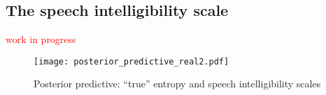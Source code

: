 \begin{comment}
It is important to highlight that for all model implementations, the visual inspection of trace, trace-rank and autocorrelation plots was performed. Additionally, we also evaluated the Gelman-Rubin diagnostic and effective number of samples \cite{Gelman_et_al_2014}. In all cases, the plots and statistics indicated the parameters achieved convergence, good mixing and lack of serial autocorrelation; all necessary requirements to be able to interpret the model estimates. 

Finally, considering the evidence provided by the previous step, we proceed to make inferences based on the selected models.
\end{comment}

\begin{comment}
	Following the successful and comprehensive analysis in \citet{vanDaal_2020} and \citet{Lesterhuis_2018}, 
	
	Notice the model depicted in panel (a) is interested on (what we can call) \textit{total effects}, i.e. the effects of the hearing characteristics, not independent from the effects of the hearing apparatus (cochlear implant or hearing aid). This is important to understand for two reasons. Since a hearing apparatus is fitted onto a child depending on aspects such as the locus and severity of his(her) hearing impairment \citep{Korver_et_al_2017}: (1) such specific children's characteristics could confound the (beneficial) effects of using specific hearing apparatuses, while (2) because children are selected from a convenient sample, not representative of their respective populations (see section \ref{s_sect:children}), the need to control for such characteristics is paramount, if we seek to obtain effects that can generalize better and beyond our sample\footnote{follow the \textit{notes} folder, to see a graphical though experiment.}.
	
	Considering the previous, we propose the model depicted in panel (b), where we control for the possible confounding variables etiology ($E_{i}$), \textcolor{blue}{as a proxy of locus}, and unaided PTA ($PTA_{i}$), as a proxy for hearing impairment severity. In that sense, the model would estimate (what we can call) the \textit{direct effects} of the hearing apparatus, independent of the children's characteristics.
\end{comment}
%
%
\subsection{The speech intelligibility scale} \label{sS:results_scales}
%
\textcolor{red}{work in progress}
%
\begin{figure}[!h]
	\centering
	\texttt{[image: posterior\_predictive\_real2.pdf]}
	\caption[Posterior predictive: ``true'' entropy and intelligibility scales]{Posterior predictive: ``true'' entropy and speech intelligibility scales}
	\label{fig:predictive2}
\end{figure}
%
%
